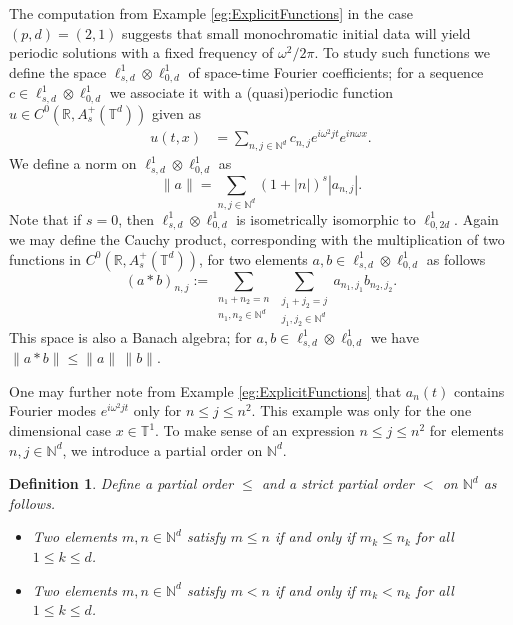 \documentclass{article}
\newtheorem{definition}[theorem]{Definition}
\newcommand{\R}{\mathbb{R}}
\newcommand{\N}{\mathbb{N}}
\newcommand{\T}{\mathbb{T}}
\begin{document}
The computation from Example \ref{eg:ExplicitFunctions} in the case $(p,d)=(2,1)$ suggests that small monochromatic initial data will yield periodic solutions with a fixed frequency of $ \omega^2/2\pi$.  
To study such functions we define the space $\ell^1_{s,d} \otimes \ell^1_{0,d}$ of space-time Fourier coefficients; for a sequence $ c \in \ell^1_{s,d} \otimes \ell^1_{0,d}$ we   associate it with a (quasi)periodic function $u \in C^0( \R , A_s^+(\T^d))$ given as  
\begin{align}\label{eq:FF_function_correspondance}
	u(t,x) &= \sum_{n,j \in \N^d}
	c_{n,j} e^{i \omega^2 j t} e^{i n \omega  x} .
\end{align}
We define a norm on $ \ell^1_{s,d} \otimes \ell^1_{0,d}$ as  
\[
\|a \| 
 = \sum_{n,j \in \N^d }  (1+|n|)^s | a_{n,j}| .
\]
Note that if $ s=0$, then $ \ell^1_{s,d} \otimes \ell^1_{0,d}$ is isometrically isomorphic to $\ell^1_{0,2d}$. 
Again we may define the Cauchy  product, corresponding with the multiplication of two functions in  $C^0( \R , A_s^+(\T^d))$, 
for  two elements $a ,  b \in \ell^1_{s,d} \otimes \ell^1_{0,d}$  as follows  
	\[
	(a * b)_{n,j} := \sum_{\substack{n_1 + n_2 = n  \\ n_1,n_2 \in \N^d}}
	\sum_{\substack{j_1 + j_2 = j  \\ j_1,j_2 \in \N^d}}
	a_{n_1,j_1} b_{n_2,j_2} .
	\]
	This space is also a Banach algebra;  for $ a,b \in \ell^1_{s,d} \otimes \ell^1_{0,d}$ we have  
	$ \| a * b \| \leq \| a  \| \, \| b \| $. 	 
	
	One may further note from  Example \ref{eg:ExplicitFunctions} that $a_n(t)$ contains Fourier modes $ e^{i \omega^2 j t}$ only for $ n \leq j \leq n^2$. 
	This example was only for the one dimensional case $ x \in \T^1$.  
	 To make sense of an expression $n \leq j \leq n^2$ for elements $ n,j \in \N^d$, we  introduce a partial order  on $ \N^d$. 
	\begin{definition}
Define a partial order $\leq$ and a strict partial order $<$ on $\N^d$ as follows. 	
		\begin{itemize}
			\item  Two elements $ m,n \in \N^d$ satisfy $m \leq n$ if and only if $ m_k \leq n_k$ for all $1 \leq k \leq d$. 
			\item Two elements $ m,n \in \N^d$ satisfy $ m < n $ if and only if $m_k < n_k$ for all $1 \leq k \leq d$.  
		\end{itemize}
	\end{definition} 
\end{document}
